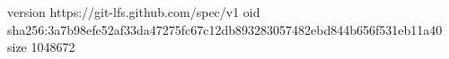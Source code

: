 version https://git-lfs.github.com/spec/v1
oid sha256:3a7b98efe52af33da47275fc67c12db893283057482ebd844b656f531eb11a40
size 1048672
